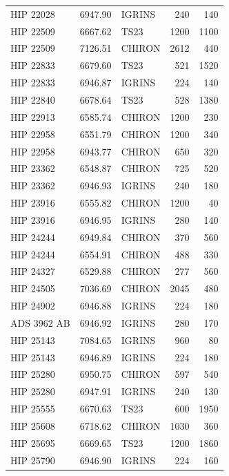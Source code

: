 \begin{scriptsize}
\begin{longtable}{|l|rlrr|}
   HIP 22028 &  6947.90 &     IGRINS &      240 &   140 \\
   HIP 22509 &  6667.62 &       TS23 &     1200 &  1100 \\
   HIP 22509 &  7126.51 &     CHIRON &     2612 &   440 \\
   HIP 22833 &  6679.60 &       TS23 &      521 &  1520 \\
   HIP 22833 &  6946.87 &     IGRINS &      224 &   140 \\
   HIP 22840 &  6678.64 &       TS23 &      528 &  1380 \\
   HIP 22913 &  6585.74 &     CHIRON &     1200 &   230 \\
   HIP 22958 &  6551.79 &     CHIRON &     1200 &   340 \\
   HIP 22958 &  6943.77 &     CHIRON &      650 &   320 \\
   HIP 23362 &  6548.87 &     CHIRON &      725 &   520 \\
   HIP 23362 &  6946.93 &     IGRINS &      240 &   180 \\
   HIP 23916 &  6555.82 &     CHIRON &     1200 &    40 \\
   HIP 23916 &  6946.95 &     IGRINS &      280 &   140 \\
   HIP 24244 &  6949.84 &     CHIRON &      370 &   560 \\
   HIP 24244 &  6554.91 &     CHIRON &      488 &   330 \\
   HIP 24327 &  6529.88 &     CHIRON &      277 &   560 \\
   HIP 24505 &  7036.69 &     CHIRON &     2045 &   480 \\
   HIP 24902 &  6946.88 &     IGRINS &      224 &   180 \\
 ADS 3962 AB &  6946.92 &     IGRINS &      280 &   170 \\
   HIP 25143 &  7084.65 &     IGRINS &      960 &    80 \\
   HIP 25143 &  6946.89 &     IGRINS &      224 &   180 \\
   HIP 25280 &  6950.75 &     CHIRON &      597 &   540 \\
   HIP 25280 &  6947.91 &     IGRINS &      240 &   130 \\
   HIP 25555 &  6670.63 &       TS23 &      600 &  1950 \\
   HIP 25608 &  6718.62 &     CHIRON &     1030 &   360 \\
   HIP 25695 &  6669.65 &       TS23 &     1200 &  1860 \\
   HIP 25790 &  6946.90 &     IGRINS &      224 &   160 \\

\end{longtable}
\end{scriptsize}
